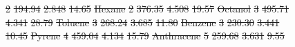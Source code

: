 \documentclass[
	12pt,				%
	openany,			%
	oneside,			%
	a4paper,			%
	english,			%
	brazil				%
	]{abntex2}
\providecommand{\DIFdel}[1]{{\protect\color{red}\sout{#1}}}
\providecommand{\DIFdelFL}[1]{\DIFdel{#1}}
\providecommand{\DIFaddbeginFL}{}
\providecommand{\DIFaddendFL}{}
\providecommand{\DIFdelendFL}{}
\providecommand{\DIFdel}[1]{{\protect\color{red}\sout{#1}}}                      %
\providecommand{\DIFdelFL}[1]{\DIFdel{#1}} %
\providecommand{\DIFaddbeginFL}{} %
\providecommand{\DIFaddendFL}{} %
\providecommand{\DIFdelendFL}{} %
\begin{document}
\begin{figure}[h]
\DIFdelFL{2     }%
\DIFdelFL{194.94               }%
\DIFdelFL{2.848              }%
\DIFdelFL{14.65       }%
\DIFdelFL{Hexane         }%
\DIFdelFL{2     }%
\DIFdelFL{376.35               }%
\DIFdelFL{4.508              }%
\DIFdelFL{19.57       }%
\DIFdelFL{Octanol        }%
\DIFdelFL{3     }%
\DIFdelFL{495.71               }%
\DIFdelFL{4.341              }%
\DIFdelFL{28.79       }%
\DIFdelFL{Toluene        }%
\DIFdelFL{3     }%
\DIFdelFL{268.24               }%
\DIFdelFL{3.685              }%
\DIFdelFL{11.80       }%
\DIFdelFL{Benzene        }%
\DIFdelFL{3     }%
\DIFdelFL{230.30               }%
\DIFdelFL{3.441              }%
\DIFdelFL{10.45       }%
\DIFdelFL{Pyrene         }%
\DIFdelFL{4     }%
\DIFdelFL{459.04               }%
\DIFdelFL{4.134              }%
\DIFdelFL{15.79       }%
\DIFdelFL{Anthracene     }%
\DIFdelFL{5     }%
\DIFdelFL{259.68               }%
\DIFdelFL{3.631              }%
\DIFdelFL{9.55        }%
\DIFdelendFL \DIFaddbeginFL \label{fig:fitede}
\end{figure}
\DIFaddendFL 
\end{document}
